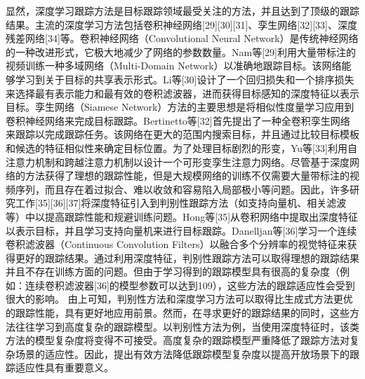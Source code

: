 \documentclass[a4paper,zihao=-4]{article}
\begin{document}
显然，深度学习跟踪方法是目标跟踪领域最受关注的方法，并且达到了顶级的跟踪结果。主流的深度学习方法包括卷积神经网络[29][30][31]、孪生网络[32][33]、深度残差网络[34]等。卷积神经网络（Convolutional Neural Network）是传统神经网络的一种改进形式，它极大地减少了网络的参数数量。Nam等[29]利用大量带标注的视频训练一种多域网络（Multi-Domain Network）以准确地跟踪目标。该网络能够学习到关于目标的共享表示形式。Li等[30]设计了一个回归损失和一个排序损失来选择最有表示能力和最有效的卷积滤波器，进而获得目标感知的深度特征以表示目标。孪生网络（Siamese Network）方法的主要思想是将相似性度量学习应用到卷积神经网络来完成目标跟踪。Bertinetto等[32]首先提出了一种全卷积孪生网络来跟踪以完成跟踪任务。该网络在更大的范围内搜索目标，并且通过比较目标模板和候选的特征相似性来确定目标位置。为了处理目标剧烈的形变，Yu等[33]利用自注意力机制和跨越注意力机制以设计一个可形变孪生注意力网络。尽管基于深度网络的方法获得了理想的跟踪性能，但是大规模网络的训练不仅需要大量带标注的视频序列，而且存在着过拟合、难以收敛和容易陷入局部极小等问题。因此，许多研究工作[35][36][37]将深度特征引入到判别性跟踪方法（如支持向量机、相关滤波等）中以提高跟踪性能和规避训练问题。Hong等[35]从卷积网络中提取出深度特征以表示目标，并且学习支持向量机来进行目标跟踪。Danelljan等[36]学习一个连续卷积滤波器（Continuous Convolution Filters）以融合多个分辨率的视觉特征来获得更好的跟踪结果。通过利用深度特征，判别性跟踪方法可以取得理想的跟踪结果并且不存在训练方面的问题。但由于学习得到的跟踪模型具有很高的复杂度（例如：连续卷积滤波器[36]的模型参数可以达到109），这些方法的跟踪适应性会受到很大的影响。
由上可知，判别性方法和深度学习方法可以取得比生成式方法更优的跟踪性能，具有更好地应用前景。然而，在寻求更好的跟踪结果的同时，这些方法往往学习到高度复杂的跟踪模型。以判别性方法为例，当使用深度特征时，该类方法的模型复杂度将变得不可接受。高度复杂的跟踪模型严重降低了跟踪方法对复杂场景的适应性。因此，提出有效方法降低跟踪模型复杂度以提高开放场景下的跟踪适应性具有重要意义。
\end{document}
